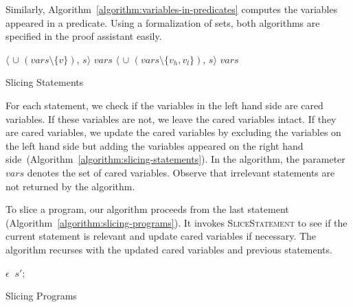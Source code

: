 Similarly, Algorithm~\ref{algorithm:variables-in-predicates} computes
the variables appeared in a predicate. Using a \coq formalization of
sets, both algorithms are specified in the proof assistant easily.

\begin{algorithm}[ht]
  \begin{algorithmic}[1]
          {\Return $\langle$ 
            $\cup$ $(\mathit{vars} \setminus \{ v \})$, $s \rangle$}
          {\Return $\mathit{vars}$}
      \EndCase
          {\Return $\langle$ $\cup$ 
            $(\mathit{vars} \setminus \{ v_h, v_l \})$, $s \rangle$}
          {\Return $\mathit{vars}$}
      \EndCase
    \EndMatch
    \EndFunction
  \end{algorithmic}
  \caption{Slicing Statements}
  \label{algorithm:slicing-statements}
\end{algorithm}

For each statement, we check if the variables in the left hand side are
cared variables. If these variables are not, we leave the cared
variables intact. If they are cared variables, we update the cared
variables by excluding the variables on the left hand side but adding
the variables appeared on the right hand
side~(Algorithm~\ref{algorithm:slicing-statements}). In the algorithm, 
the parameter $\mathit{vars}$ denotes the set of cared variables.
Observe that irrelevant statements are not returned by the algorithm.

To slice a program, our algorithm proceeds from the last statement
(Algorithm~\ref{algorithm:slicing-programs}). It invokes
\textsc{SliceStatement} to see if the current statement is relevant
and update cared variables if necessary. The algorithm recurses with
the updated cared variables and previous statements.

\begin{algorithm}[ht]
  \begin{algorithmic}[1]
      \Case{$\epsilon$}
        \Return $\epsilon$
      \EndCase
            \Return {}
          \EndCase
            \Return {}$\ s';$
          \EndCase
        \EndMatch
      \EndCase
    \EndMatch
    \EndFunction
  \end{algorithmic}
  \caption{Slicing Programs}
  \label{algorithm:slicing-programs}
\end{algorithm}

